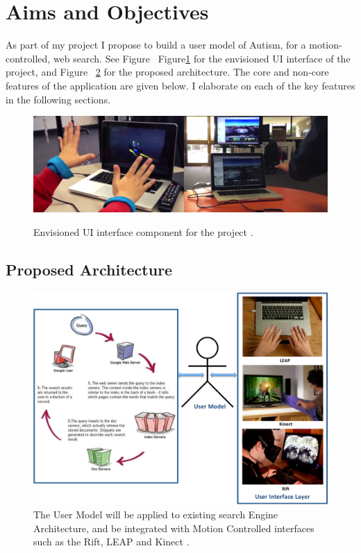 \documentclass[a4paper, 10pt]{article}
\begin{document}
\section{Aims and Objectives} 
As part of my project I propose to build a user model of Autism, for a motion-controlled, web search. See Figure ~Figure\ref{vision} for the envisioned UI interface of the project, and Figure ~\ref{architec} for the proposed architecture. The core and non-core features of the application are given below. I elaborate on each of the key features in the following sections. 

\begin{figure}[H]
\begin{center}
\includegraphics[scale=0.35]{vision}\\
\caption{Envisioned UI interface component for the project \cite{leap}.}
\label{vision}
\end{center}
\end{figure}

\subsection{Proposed Architecture}\label{proposed}
\begin{figure}[H]
\begin{center}
    \includegraphics[scale=0.3]{searchEngArchi}
    \caption{The User Model will be applied to existing search Engine Architecture\cite{seimage}, and be integrated with Motion Controlled interfaces such as the Rift, LEAP and Kinect \cite{rift, leap, kinect}.}
    \label{architec}
\end{center}
\end{figure}
\end{document}
